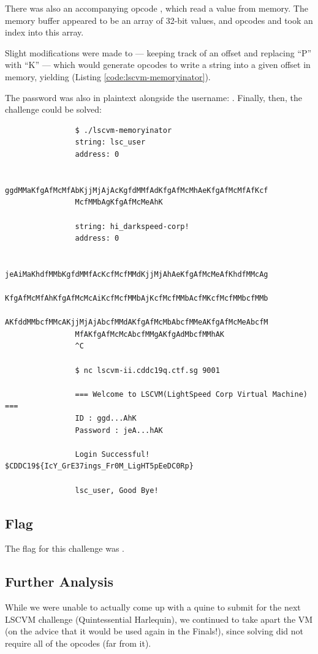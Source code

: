 		There was also an accompanying opcode , which read a value from memory. The memory buffer appeared to be an array of 32-bit
		values, and opcodes  and  took an index into this array.

		Slight modifications were made to  --- keeping track of an offset and replacing \enquote{P} with \enquote{K} ---
		which would generate opcodes to write a string into a given offset in memory, yielding 
		(Listing \ref{code:lscvm-memoryinator}).

		\pagebreak
		The password was also in plaintext alongside the username: . Finally, then, the challenge could be solved:

		\begin{listing}[!htbp]
			\begin{verbatim}
				$ ./lscvm-memoryinator
				string: lsc_user
				address: 0

				ggdMMaKfgAfMcMfAbKjjMjAjAcKgfdMMfAdKfgAfMcMhAeKfgAfMcMfAfKcf
				McfMMbAgKfgAfMcMeAhK

				string: hi_darkspeed-corp!
				address: 0

				jeAiMaKhdfMMbKgfdMMfAcKcfMcfMMdKjjMjAhAeKfgAfMcMeAfKhdfMMcAg
				KfgAfMcMfAhKfgAfMcMcAiKcfMcfMMbAjKcfMcfMMbAcfMKcfMcfMMbcfMMb
				AKfddMMbcfMMcAKjjMjAjAbcfMMdAKfgAfMcMbAbcfMMeAKfgAfMcMeAbcfM
				MfAKfgAfMcMcAbcfMMgAKfgAdMbcfMMhAK
				^C

				$ nc lscvm-ii.cddc19q.ctf.sg 9001

				=== Welcome to LSCVM(LightSpeed Corp Virtual Machine) ===
				ID : ggd...AhK
				Password : jeA...hAK

				Login Successful! $CDDC19${IcY_GrE37ings_Fr0M_LigHT5pEeDC0Rp}

				lsc_user, Good Bye!
			\end{verbatim}
		\end{listing}



	\subsection{Flag}
		The flag for this challenge was .


	\subsection{Further Analysis}
		While we were unable to actually come up with a quine to submit for the next LSCVM challenge (Quintessential Harlequin), we
		continued to take apart the VM (on the advice that it would be used again in the Finals!), since solving  did
		not require all of the opcodes (far from it).

